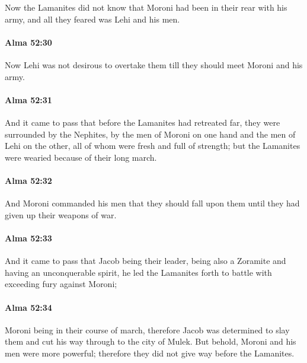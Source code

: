			Now the Lamanites did not know
			that Moroni had been in their rear with his army,
			and all they feared was Lehi and his men.

		\paragraph{Alma 52:30} %
			\label{ALMA-52-30}

			Now Lehi was not desirous to overtake them
			till they should meet Moroni and his army.

		\paragraph{Alma 52:31} %
			\label{ALMA-52-31}

			And it came to pass that before the Lamanites had retreated far,
			they were surrounded by the Nephites,
			by the men of Moroni on one hand and the men of Lehi on the other,
			all of whom were fresh and full of strength;
			but the Lamanites were wearied because of their long march.

		\paragraph{Alma 52:32} %
			\label{ALMA-52-32}

			And Moroni commanded his men that they should fall upon them
			until they had given up their weapons of war.

		\paragraph{Alma 52:33} %
			\label{ALMA-52-33}

			And it came to pass that Jacob being their leader,
			being also a Zoramite and having an unconquerable spirit,
			he led the Lamanites forth to battle with exceeding fury against Moroni;

		\paragraph{Alma 52:34} %
			\label{ALMA-52-34}

			Moroni being in their course of march,
			therefore Jacob was determined to slay them
			and cut his way through to the city of Mulek.
			But behold, Moroni and his men were more powerful;
			therefore they did not give way before the Lamanites.

